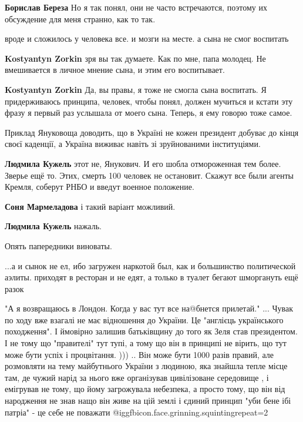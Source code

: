\begin{itemize}
\begin{itemize}
\textbf{Борислав Береза} Но я так понял, они не часто встречаются, поэтому их обсуждение для меня странно, как то так.
\end{itemize} %

вроде и сложилось у человека все. и мозги на месте. а сына не смог воспитать

\begin{itemize} %
\textbf{Kostyantyn Zorkin} зря вы так думаете. Как по мне, папа молодец. Не вмешивается в личное мнение сына, и этим его воспитывает.

\textbf{Kostyantyn Zorkin} Да, вы правы, я тоже не смогла сына воспитать. Я придерживаюсь принципа, человек, чтобы понял, должен мучиться и кстати эту фразу я первый раз услышала от моего сына. Теперь, я ему говорю тоже самое.
\end{itemize} %


Приклад Януковоща доводить, що в Україні не кожен президент добуває до кінця
своєї каденції, а Україна виживає навіть зі зруйнованими інституціями.

\begin{itemize} %
\textbf{Людмила Кужель} этот не, Янукович. И его шобла отмороженная тем более. Зверье ещё то. Этих, смерть 100 человек не остановит. Скажут все были агенты Кремля, соберут РНБО и введут военное положение.

\textbf{Соня Мармеладова} і такий варіант можливий.

\textbf{Людмила Кужель} нажаль.
\end{itemize} %

Опять папередники виноваты.


...а и сынок не ел, ибо загружен наркотой был, как и большинство политической
аэлиты. приходят в ресторан и не едят, а только в туалет бегают шморгануть ещё
разок



"А я возвращаюсь в Лондон. Когда у вас тут все на@бнется прилетай." ... Чувак
по ходу вже взагалі не має відношення до України. Це "англієць українського
походження". І ймовірно залишив батьківщину до того як Зеля став президентом. І
не тому що "правителі" тут тупі, а тому що він в принципі не вірить, що тут
може бути успіх і процвітання. ))) .. Він може бути 1000 разів правий, але
розмовляти на тему майбутнього України з людиною, яка знайшла тепле місце там,
де чужий нарід за нього вже організував цивілізоване середовище , і емігрував
не тому, що йому загрожувала небезпека, а просто тому, що він від народження не
знав нащо він живе на цій землі і єдиний принцип "уби бене ібі патріа" - це
себе не поважати  @igg{fbicon.face.grinning.squinting}{repeat=2} 


\end{itemize}

